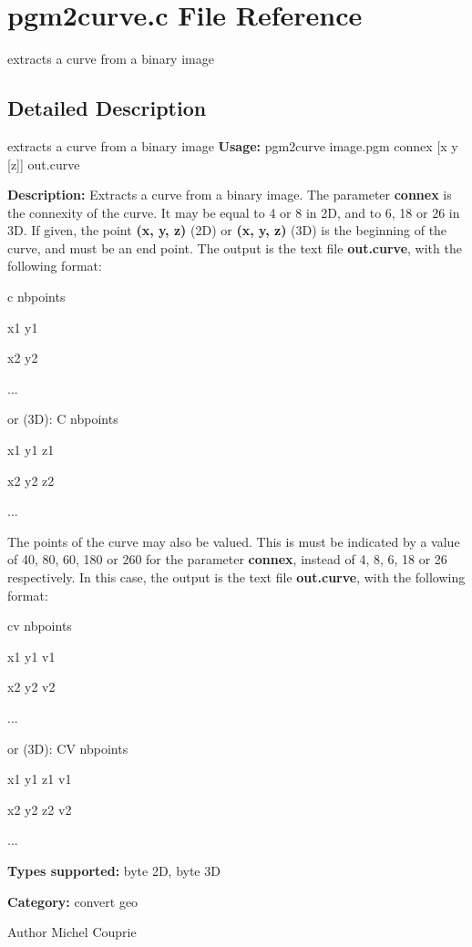 \section{pgm2curve.c File Reference}
\label{pgm2curve_8c}


extracts a curve from a binary image  




\subsection{Detailed Description}
extracts a curve from a binary image {\bfseries Usage:} pgm2curve image.pgm connex [x y [z]] out.curve

{\bfseries Description:} Extracts a curve from a binary image. The parameter {\bfseries connex} is the connexity of the curve. It may be equal to 4 or 8 in 2D, and to 6, 18 or 26 in 3D. If given, the point {\bfseries (x, y, z)} (2D) or {\bfseries (x, y, z)} (3D) is the beginning of the curve, and must be an end point. The output is the text file {\bfseries out.curve}, with the following format:\par
 c nbpoints\par
 x1 y1\par
 x2 y2\par
 ...\par
 or (3D): C nbpoints\par
 x1 y1 z1\par
 x2 y2 z2\par
 ...\par


The points of the curve may also be valued. This is must be indicated by a value of 40, 80, 60, 180 or 260 for the parameter {\bfseries connex}, instead of 4, 8, 6, 18 or 26 respectively. In this case, the output is the text file {\bfseries out.curve}, with the following format:\par
 cv nbpoints\par
 x1 y1 v1\par
 x2 y2 v2\par
 ...\par
 or (3D): CV nbpoints\par
 x1 y1 z1 v1\par
 x2 y2 z2 v2\par
 ...\par


{\bfseries Types supported:} byte 2D, byte 3D

{\bfseries Category:} convert geo

\begin{DoxyAuthor}{Author}
Michel Couprie 
\end{DoxyAuthor}
